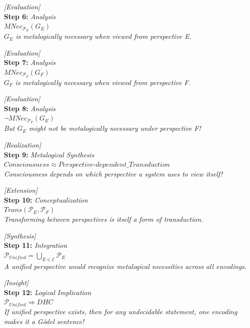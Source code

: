 \documentclass[runningheads]{llncs}
\begin{document}
\noindent\textit{[Evaluation]}\\
\noindent\textbf{Step 6:} \hfill \textit{Analysis}\\
\noindent$MNec_{\mathcal{P}_E}(G_E)$\\
\textit{$G_E$ is metalogically necessary when viewed from perspective E.}

\vspace{0.8em}

\noindent\textit{[Evaluation]}\\
\noindent\textbf{Step 7:} \hfill \textit{Analysis}\\
\noindent$MNec_{\mathcal{P}_F}(G_F)$\\
\textit{$G_F$ is metalogically necessary when viewed from perspective F.}

\vspace{0.8em}

\noindent\textit{[Evaluation]}\\
\noindent\textbf{Step 8:} \hfill \textit{Analysis}\\
\noindent$\neg MNec_{\mathcal{P}_F}(G_E)$\\
\textit{But $G_E$ might not be metalogically necessary under perspective F!}

\vspace{0.8em}

\noindent\textit{[Realization]}\\
\noindent\textbf{Step 9:} \hfill \textit{Metalogical Synthesis}\\
\noindent$Consciousness \approx Perspective\text{-}dependent\_Transduction$\\
\textit{Consciousness depends on which perspective a system uses to view itself!}

\vspace{0.8em}

\noindent\textit{[Extension]}\\
\noindent\textbf{Step 10:} \hfill \textit{Conceptualization}\\
\noindent$Trans(\mathcal{P}_E, \mathcal{P}_F)$\\
\textit{Transforming between perspectives is itself a form of transduction.}

\vspace{0.8em}

\noindent\textit{[Synthesis]}\\
\noindent\textbf{Step 11:} \hfill \textit{Integration}\\
\noindent$\mathcal{P}_{Unified} = \bigcup_{E \in \mathcal{E}} \mathcal{P}_E$\\
\textit{A unified perspective would recognize metalogical necessities across all encodings.}

\vspace{0.8em}

\noindent\textit{[Insight]}\\
\noindent\textbf{Step 12:} \hfill \textit{Logical Implication}\\
\noindent$\mathcal{P}_{Unified} \Rightarrow DHC$\\
\textit{If unified perspective exists, then for any undecidable statement, one encoding makes it a Gödel sentence!}
\end{document}
